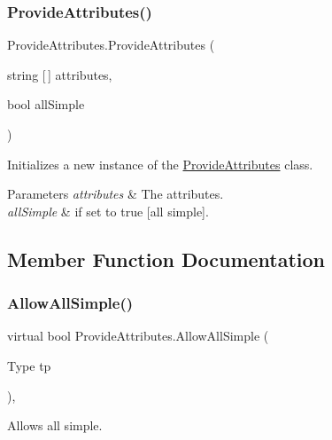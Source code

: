 \subsubsection{\texorpdfstring{Provide\+Attributes()}{ProvideAttributes()}\hspace{0.1cm}{\footnotesize\ttfamily [2/2]}}
{\footnotesize\ttfamily Provide\+Attributes.\+Provide\+Attributes (\begin{DoxyParamCaption}\item[{string \mbox{[}$\,$\mbox{]}}]{attributes,  }\item[{bool}]{all\+Simple }\end{DoxyParamCaption})\hspace{0.3cm}{\ttfamily [inline]}}



Initializes a new instance of the \hyperlink{class_provide_attributes}{Provide\+Attributes} class. 


\begin{DoxyParams}{Parameters}
{\em attributes} & The attributes.\\
\hline
{\em all\+Simple} & if set to {\ttfamily true} \mbox{[}all simple\mbox{]}.\\
\hline
\end{DoxyParams}


\subsection{Member Function Documentation}
\mbox{\label{class_provide_attributes_a9b4c8e178f74bc4fc69ed9b2747f173d}} 
\subsubsection{\texorpdfstring{Allow\+All\+Simple()}{AllowAllSimple()}}
{\footnotesize\ttfamily virtual bool Provide\+Attributes.\+Allow\+All\+Simple (\begin{DoxyParamCaption}\item[{Type}]{tp }\end{DoxyParamCaption})\hspace{0.3cm}{\ttfamily [inline]}, {\ttfamily [virtual]}}



Allows all simple. 


